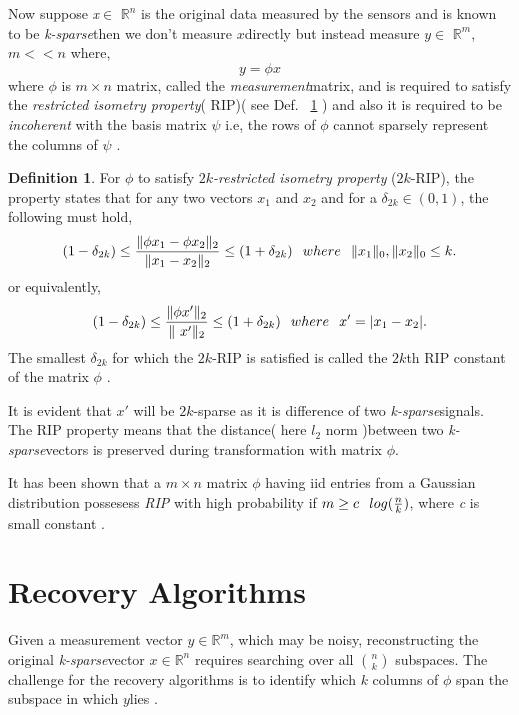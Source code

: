 \documentclass[12pt]{article}
\theoremstyle{definition}
\newtheorem{defn}{Definition}[section]
\def\ksparse{\textit{k-sparse}\hspace{0.1in}}
\def\measurement{\textit{measurement}\hspace{0.1in}}
\def\x{$x$\hspace{0.1in}}
\def\y{$y$\hspace{0.1in}}
\begin{document}
\par Now suppose \textit{x}$\in$ $\mathbb{R}^n$ is the original data measured by the sensors and 
is known to be \ksparse then we don't measure \x directly but instead measure \y$\in$ $\mathbb{R}^m$, $m << n$ where,
\begin{equation}
 y = \phi x
\end{equation}
where $\phi$ is $m\times n$ matrix, called the \measurement matrix, and is required to satisfy the \textit{restricted
isometry property}( RIP)( see Def. ~\ref{def:RIP} ) and also it is required to be \textit{incoherent} with the basis matrix $\psi$ 
i.e, the rows of $\phi$ cannot sparsely represent the columns of $\psi$ \cite{Baraniuk-CS}.
\begin{defn}
 For $\phi$ to satisfy $2k$\textit{-restricted isometry property} ($2k$-RIP), the property states that 
 for any two vectors $x_1$ and $x_2$ and for
 a $\delta_{2k} \in (0,1)$, the following must hold,
  \begin{equation}
  (1 - \delta_{2k}) \leq \frac{\|\phi x_1-\phi x_2 \|_2}{\|x_1-x_2\|_2} \leq (1 + \delta_{2k}) \hspace{0.1in}
  where \hspace{0.1in} \|x_1\|_0, \|x_2\|_0 \leq k.
 \end{equation}
 or equivalently,
 \begin{equation}
  (1 - \delta_{2k}) \leq \frac{\|\phi x'\|_2}{\|\ x'\|_2} \leq (1 + \delta_{2k}) \hspace{0.1in}
  where \hspace{0.1in} x'=|x_1-x_2|.
 \end{equation}
 The smallest $\delta_{2k}$ for which the $2k$-RIP is satisfied is called the 
 $2k$th RIP constant of the matrix $\phi$ \cite{Needell-CoSaMP}.
 \label{def:RIP}
  \end{defn}
  It is evident that $x'$ will be $2k$-sparse as it is difference of two \ksparse signals.
  The RIP property means that the distance( here $l_2$ norm )between two \ksparse vectors is preserved
  during transformation with matrix $\phi$.
  
 \par It has been shown that a $m \times n$ matrix $\phi$ having iid entries from a Gaussian distribution
  possesess \textit{RIP} with high probability if $m \geq c\hspace{0.1in}log(\frac{n}{k})$, 
 where \textit{c} is small constant \cite{Baraniuk-CS}.

\section{Recovery Algorithms}
Given a measurement vector \y $\in \mathbb{R}^m$, which may be noisy, reconstructing the original \ksparse vector \x $\in \mathbb{R}^n$
requires searching over all $\binom{n}{k}$ subspaces. The challenge for the recovery algorithms is to identify 
which $k$ columns of $\phi$ span the subspace in which \y lies \cite{Dai-subspace}.
\end{document}
